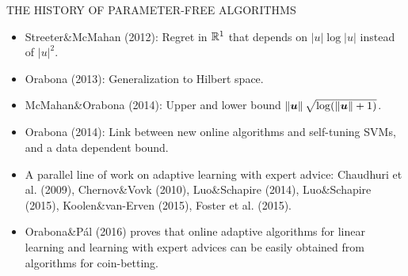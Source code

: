 \documentclass[final,t,serif,mathserif]{beamer}
\begin{document}
\begin{frame}{}
\begin{columns}[t]
\begin{column}{.33\linewidth}
    \begin{block}{THE HISTORY OF PARAMETER-FREE ALGORITHMS}
    \begin{itemize}
    \item Streeter\&McMahan (2012): Regret in $\mathbb{R}^1$ that depends on $|u| \log|u|$ instead of $|u|^2$.
    \item Orabona (2013): Generalization to Hilbert space.
    \item McMahan\&Orabona (2014): Upper and lower bound $\left\|{\boldsymbol{u}}\right\| \sqrt{\log(\left\|{\boldsymbol{u}}\right\|+1)}$.
    \item Orabona (2014): Link between new online algorithms and self-tuning SVMs, and a data dependent bound.
    \item A parallel line of work on adaptive learning with expert advice: Chaudhuri et al. (2009), Chernov\&Vovk (2010), Luo\&Schapire (2014), Luo\&Schapire (2015), Koolen\&van-Erven (2015), Foster et al. (2015).
    \item Orabona\&P\'al (2016) proves that online adaptive algorithms for linear learning and learning with expert advices can be easily obtained from algorithms for coin-betting.
    \end{itemize}

    \end{block}




\end{column}
\end{columns}
\end{frame}
\end{document}
